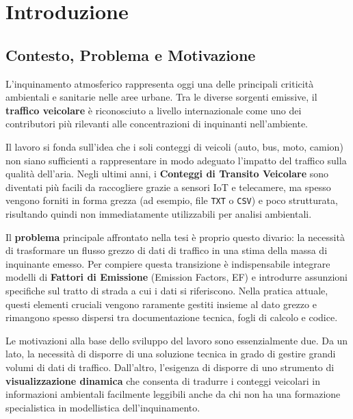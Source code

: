 \documentclass[12pt, oneside]{extbook}
\begin{document}
\newpage
\thispagestyle{empty}
\mbox{}
\newpage


\tableofcontents

\newpage
\thispagestyle{empty}
\mbox{}
\newpage



\chapter{Introduzione}

\section{Contesto, Problema e Motivazione}
\label{sec:contesto}
L'inquinamento atmosferico rappresenta oggi una delle principali criticità ambientali e sanitarie nelle aree urbane.
Tra le diverse sorgenti emissive, il \textbf{traffico veicolare} è riconosciuto a livello internazionale come uno dei contributori più rilevanti alle concentrazioni di inquinanti nell'ambiente.

Il lavoro si fonda sull’idea che i soli conteggi di veicoli (auto, bus, moto, camion) non siano sufficienti a rappresentare in modo adeguato l’impatto del traffico sulla qualità dell’aria.
Negli ultimi anni, i \textbf{Conteggi di Transito Veicolare} sono diventati più facili da raccogliere grazie a sensori IoT e telecamere, ma spesso vengono forniti in forma grezza (ad esempio, file \texttt{TXT} o \texttt{CSV}) e poco strutturata, risultando quindi non immediatamente utilizzabili per analisi ambientali.

Il \textbf{problema} principale affrontato nella tesi è proprio questo divario: la necessità di trasformare un flusso grezzo di dati di traffico in una stima della massa di inquinante emesso.
Per compiere questa transizione è indispensabile integrare modelli di \textbf{Fattori di Emissione} (Emission Factors, EF) e introdurre assunzioni specifiche sul tratto di strada a cui i dati si riferiscono.
Nella pratica attuale, questi elementi cruciali vengono raramente gestiti insieme al dato grezzo e rimangono spesso dispersi tra documentazione tecnica, fogli di calcolo e codice.

Le motivazioni alla base dello sviluppo del lavoro sono essenzialmente due.
Da un lato, la necessità di disporre di una soluzione tecnica in grado di gestire grandi volumi di dati di traffico.
Dall’altro, l’esigenza di disporre di uno strumento di \textbf{visualizzazione dinamica} che consenta di tradurre i conteggi veicolari in informazioni ambientali facilmente leggibili anche da chi non ha una formazione specialistica in modellistica dell’inquinamento.
\end{document}
